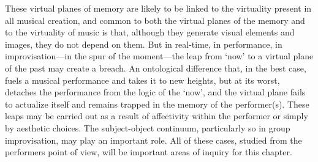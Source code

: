 
These virtual planes of memory are likely to be linked to the virtuality present in all musical creation, and common to both the virtual planes of the memory and to the virtuality of music is that, although they generate visual elements and images, they do not depend on them.
But in real-time, in performance, in improvisation---in the spur of the moment---the leap from `now' to a virtual plane of the past may create a breach. An ontological difference that, in the best case, fuels a musical performance and takes it to new heights, but at its worst, detaches the performance from the logic of the `now', and the virtual plane fails to actualize itself and remains trapped in the memory of the performer(s). These leaps may be carried out as a result of affectivity within the performer or simply by aesthetic choices. The subject-object continuum, particularly so in group improvisation, may play an important role. 
All of these cases, studied from the performers point of view, will be important areas of inquiry for this chapter. %

